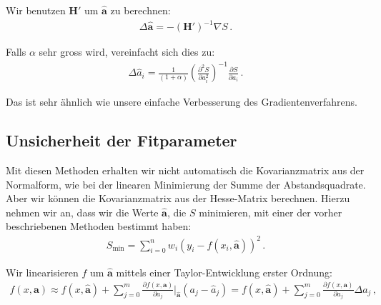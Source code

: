 Wir benutzen $\boldsymbol{H}'$ um $\boldsymbol{\hat{a}}$ zu berechnen:
\begin{align}
\Delta \boldsymbol{\hat{a}} = - (\boldsymbol{H}')^{-1} \nabla S\,.
\label{eq:vl9-17}
\end{align}

Falls $\alpha$ sehr gross wird, vereinfacht sich dies zu:
\begin{align}
\Delta \hat{a}_i = \frac{1}{ (1 + \alpha) } \left( \frac{ \partial^2 S }{ \partial a_i^2 } \right)^{-1} \frac{ \partial S }{ \partial a_i } \,.
\label{eq:vl9-18}
\end{align}

Das ist sehr \"ahnlich wie unsere einfache Verbesserung des Gradientenverfahrens.


\subsection{Unsicherheit der Fitparameter}
\label{subsec:vl9-2}

Mit diesen Methoden erhalten wir nicht automatisch die Kovarianzmatrix aus der Normalform, wie bei der linearen Minimierung der Summe der Abstandsquadrate. Aber wir k\"onnen die Kovarianzmatrix aus der Hesse-Matrix berechnen. Hierzu nehmen wir an, dass wir die Werte $\boldsymbol{\hat{a}}$, die $S$ minimieren, mit einer der vorher beschriebenen Methoden bestimmt haben:
\begin{align}
S_\text{min} = \sum_{i=0}^n w_i (y_i - f (x_i, \boldsymbol{\hat{a}}))^2\,.
\label{eq:vl9-19}
\end{align}

Wir linearisieren $f$ um $\boldsymbol{\hat{a}}$ mittels einer Taylor-Entwicklung erster Ordnung:
\begin{align}
f(x, \boldsymbol{a}) \approx f(x, \boldsymbol{\hat{a}}) + \sum_{j=0}^m \frac{ \partial f (x, \boldsymbol{a}) }{ \partial a_j } \bigg|_{\boldsymbol{\hat{a}}} (a_j - \hat{a}_j) = f(x, \boldsymbol{\hat{a}}) + \sum_{j=0}^m \frac{ \partial f(x, \boldsymbol{a}) }{ \partial a_j } \Delta a_j\,,
\label{eq:vl9-20}
\end{align}

